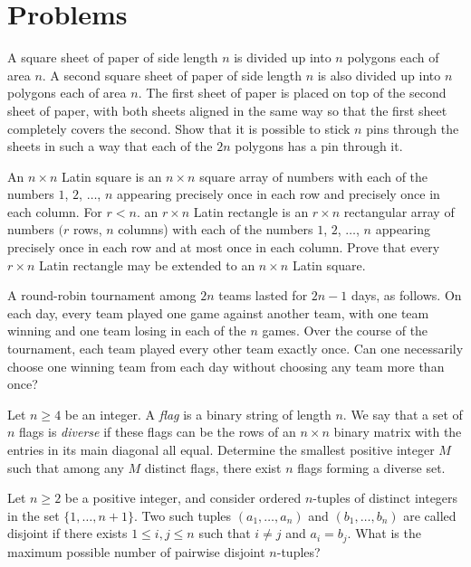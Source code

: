 \documentclass[11pt]{article}
\begin{document}
\section{Problems}

\begin{problem}
	A square sheet of paper of side length $n$ is divided up into $n$ polygons each of area $n$. A second square sheet of paper of side length $n$ is also divided up into $n$ polygons each of area $n$. The first sheet of paper is placed on top of the second sheet of paper, with both sheets aligned in the same way so that the first sheet completely covers the second. Show that it is possible to stick $n$ pins through the sheets in such a way that each of the $2 n$ polygons has a pin through it.
\end{problem}

\begin{problem}
	An $n \times n$ Latin square is an $n \times n$ square array of numbers with each of the numbers $1$, $2$, $\ldots$, $n$ appearing precisely once in each row and precisely once in each column. For $r<n$. an $r \times n$ Latin rectangle is an $r \times n$ rectangular array of numbers $(r$ rows, $n$ columns) with each of the numbers $1$, $2$, $\ldots$, $n$ appearing precisely once in each row and at most once in each column. Prove that every $r \times n$ Latin rectangle may be extended to an $n \times n$ Latin
	square.
\end{problem}

\begin{problem}
	A round-robin tournament among $2 n$ teams lasted for $2 n-1$ days, as follows. On each day, every team played one game against another team, with one team winning and one team losing in each of the $n$ games. Over the course of the tournament, each team played every other team exactly once. Can one necessarily choose one winning team from each day without choosing any team more than once?
\end{problem}

\begin{problem}
	Let $n \geq 4$ be an integer. A \emph{flag} is a binary string of length $n$. We say that a set of $n$ flags is \emph{diverse} if these flags can be the rows of an $n \times n$ binary matrix with the entries in its main diagonal all equal. Determine the smallest positive integer $M$ such that among any $M$ distinct flags, there exist $n$ flags forming a diverse set.
\end{problem}

\begin{problem}
	Let $n \geq 2$ be a positive integer, and consider ordered $n$-tuples of distinct integers in the set $\{1, \ldots, n+1\}$. Two such tuples $\left(a_{1}, \ldots, a_{n}\right)$ and $\left(b_{1}, \ldots, b_{n}\right)$ are called disjoint if there exists $1 \leq i, j \leq n$ such that $i \neq j$ and $a_{i}=b_{j}$. What is the maximum possible number of pairwise disjoint $n$-tuples?
\end{problem}
\end{document}
